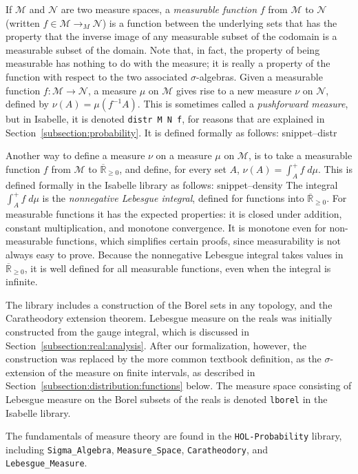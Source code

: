 \documentclass{svjour3}
\newcommand{\ennRR}{\overline{\mathbb{R}}_{\ge 0}}
\newcommand{\mdl}[1]{{\mathcal #1}} %
\newcommand{\Snippet}[1]{\csname snippet--#1\endcsname}
\begin{document}
If $\mdl M$ and $\mdl N$ are two measure spaces, a \emph{measurable function} $f$ from $\mdl M$ to $\mdl N$ (written $f \in \mdl{M} \rightarrow_M \mdl{N}$) is a function between the underlying sets that has the property that the inverse image of any measurable subset of the codomain is a measurable subset of the domain. Note that, in fact, the property of being measurable has nothing to do with the measure; it is really a property of the function with respect to the two associated $\sigma$-algebras. Given a measurable function $f : \mdl M \to \mdl N$, a measure $\mu$ on $\mdl M$ gives rise to a new measure $\nu$ on $\mdl N$, defined by $\nu(A) = \mu(f^{-1} A)$. This is sometimes called a \emph{pushforward measure}, but in Isabelle, it is denoted \texttt{distr M N f}, for reasons that are explained in Section~\ref{subsection:probability}. It is defined formally as follows:
\Snippet{distr}

Another way to define a measure $\nu$ on a measure $\mu$ on $\mdl M$, is to take a measurable function $f$ from $\mdl M$ to $\ennRR$, and define, for every set $A$, $\nu(A) = \int_A^+ f \; d\mu$. This is defined formally in the Isabelle library as follows:
\Snippet{density}
The integral $\int_A^+ f \; d\mu$ is the \emph{nonnegative Lebesgue integral}, defined for functions into $\ennRR$. For measurable functions it has the expected properties: it is closed under addition, constant multiplication, and monotone convergence. It is monotone even for non-measurable functions, which simplifies certain proofs, since measurability is not always easy to prove. Because the nonnegative Lebesgue integral takes values in $\ennRR$, it is well defined for all measurable functions, even when the integral is infinite.

The library includes a construction of the Borel sets in any topology, and the Caratheodory extension theorem. Lebesgue measure on the reals was initially constructed from the gauge integral, which is discussed in Section~\ref{subsection:real:analysis}. After our formalization, however, the construction was replaced by the more common textbook definition, as the $\sigma$-extension of the measure on finite intervals, as described in Section~\ref{subsection:distribution:functions} below. The measure space consisting of Lebesgue measure on the Borel subsets of the reals is denoted \texttt{lborel} in the Isabelle library. 

The fundamentals of measure theory are found in the \texttt{HOL-Probability} library, including \texttt{Sigma\_Algebra}, \texttt{Measure\_Space}, \texttt{Caratheodory}, and \texttt{Lebesgue\_Measure}.
\end{document}
